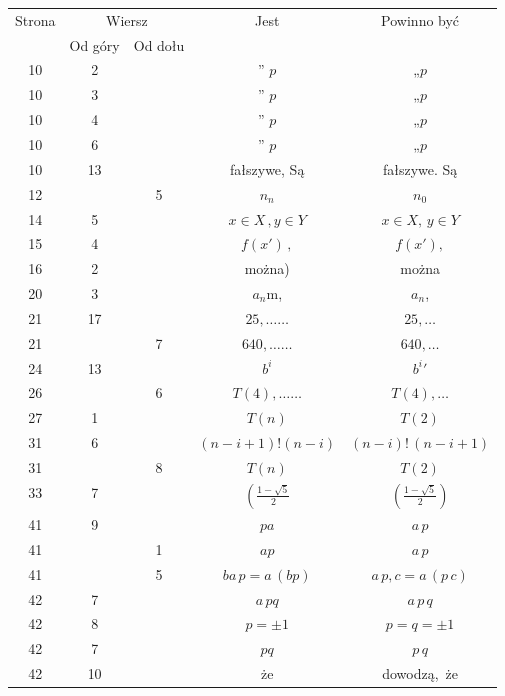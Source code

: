 \documentclass[a4paper,11pt]{article}
\numberwithin{equation}{section}
\begin{document}
\begin{center}

  \begin{tabular}{|c|c|c|c|c|}
    \hline
    Strona & \multicolumn{2}{c|}{Wiersz} & Jest
    & Powinno być \\ \cline{2-3}
    & Od góry & Od dołu & & \\
    \hline
    10  &  2 & & ” $p$ & „$p$ \\
    10  &  3 & & ” $p$ & „$p$ \\
    10  &  4 & & ” $p$ & „$p$ \\
    10  &  6 & & ” $p$ & „$p$ \\
    10  & 13 & & fałszywe, Są & fałszywe. Są \\
    12  & &  5 & $n_{ n }$ & $n_{ 0 }$ \\
    14  &  5 & & $x \in X \, , y \in Y$ & $x \in X, \, y \in Y$ \\
    15  &  4 & & $f( x' ) \, ,$ & $f( x' ),$ \\
    16  &  2 & & można) & można \\
    20  &  3 & & $a_{ n }$m, & $a_{ n }$, \\
    21  & 17 & & $25, \ldots \ldots$ & $25, \ldots$ \\
    21  & &  7 & $640, \ldots \ldots$ & $640, \ldots$ \\
    24  & 13 & & $b^{ i }$ & $b^{ i }{}'$ \\
    26  & &  6 & $T( 4 ), \ldots \ldots$ & $T( 4 ), \ldots$ \\
    27  &  1 & & $T( n )$ & $T( 2 )$ \\
    31  &  6 & & $( n - i + 1 )! ( n - i )$
    & $( n - i )! \, ( n - i + 1 )$ \\
    31  & &  8 & $T( n )$ & $T( 2 )$ \\
    33  &  7 & & $\left( \frac{ 1 - \sqrt{ 5 } }{ 2 } \right.$
    & $\left( \frac{ 1 - \sqrt{ 5 } }{ 2 } \right)$ \\
    41  &  9 & & $p a$ & $a \, p$ \\
    41  & &  1 & $a p$ & $a \, p$ \\
    41  & &  5 & $ba \, p = a \, ( b p )$ & $a \, p , c = a \, ( p \, c )$ \\
    42  &  7 & & $a \, p q$ & $a \, p \, q$ \\
    42  &  8 & & $p = \pm 1$ & $p = q = \pm 1$ \\
    42  &  7 & & $pq$ & $p \, q$ \\
    42  & 10 & & że & dowodzą,~że \\

\end{tabular}
\end{center}
\end{document}
